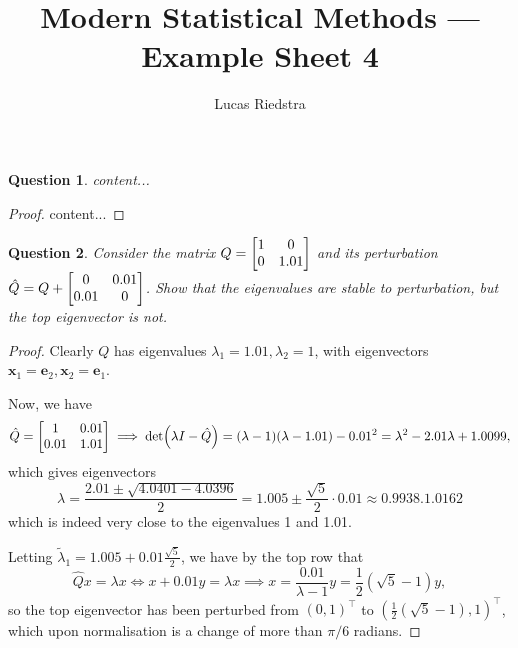 \documentclass{article}
\title{Modern Statistical Methods --- Example Sheet 4} %
\author{Lucas Riedstra}
\theoremstyle{plain}
\newtheorem{question}{Question}
\theoremstyle{remark}
\renewcommand{\vec}{\mathbf}
\newcommand{\T}{^\top} %
\begin{document}
\maketitle
\begin{question}
	content...
\end{question}

\begin{proof}
	content...
\end{proof}

\begin{question}
	Consider the matrix $Q = \mqty[1 & 0 \\ 0 & 1.01]$ and its perturbation $\hat Q = Q + \mqty[0 & 0.01 \\ 0.01 & 0]$. Show that the eigenvalues are stable to perturbation, but the top eigenvector is not.
\end{question}

\begin{proof}
	Clearly $Q$ has eigenvalues $\lambda_1 = 1.01, \lambda_2 = 1$, with eigenvectors $\vec x_1 = \vec e_2, \vec x_2 = \vec e_1$. 
	
	Now, we have
	\[
	\hat Q = \mqty[ 1 & 0.01 \\ 0.01 & 1.01] \implies \det(\lambda I - \hat Q) = (\lambda - 1)(\lambda - 1.01) - 0.01^2 = \lambda^2  - 2.01\lambda + 1.0099,
	\]
	which gives eigenvectors
	\[
	\lambda = \frac{2.01 \pm \sqrt{4.0401 - 4.0396}}{2} = 1.005 \pm \frac{\sqrt 5}{2} \cdot 0.01 \approx \qty{0.9938, 1.0162}
	\]
	which is indeed very close to the eigenvalues 1 and 1.01. 
	
	Letting $\tilde \lambda_1 = 1.005 + 0.01\frac{\sqrt5}{2}$, we have by the top row that
	\[
	\hat Q x = \lambda x \iff x + 0.01 y = \lambda x \implies 
	x = \frac{0.01}{\lambda - 1}y = \frac12(\sqrt 5 - 1) y,
		\]
		so the top eigenvector has been perturbed from $(0, 1)\T$ to $(\frac12(\sqrt 5 - 1), 1)\T$, which upon normalisation is a change of more than $\pi/6$ radians. 
\end{proof}
\end{document}

